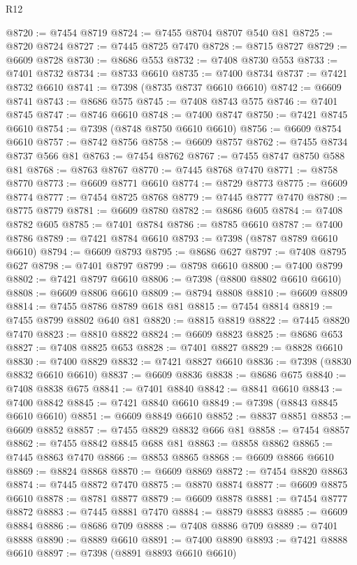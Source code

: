 \begin{lexlean}{R12}
\begin{coremodule}
{{{{{{{{{{{{{{{{{{{{{{{{{{{{{{{{{{{{{{{{{{{{{{{{{{{{{{{{{{{{{{{{{{{{{{{{{{{{{{{{{{@8720 := @7454 @8719
@8724 := @7455 @8704 @8707 @540 @81
@8725 := @8720 @8724
@8727 := @7445 @8725 @7470
@8728 := @8715 @8727
@8729 := @6609 @8728
@8730 := @8686 @553
@8732 := @7408 @8730 @553
@8733 := @7401 @8732
@8734 := @8733 @6610
@8735 := @7400 @8734
@8737 := @7421 @8732 @6610
@8741 := @7398 (@8735 @8737 @6610 @6610)
@8742 := @6609 @8741
@8743 := @8686 @575
@8745 := @7408 @8743 @575
@8746 := @7401 @8745
@8747 := @8746 @6610
@8748 := @7400 @8747
@8750 := @7421 @8745 @6610
@8754 := @7398 (@8748 @8750 @6610 @6610)
@8756 := @6609 @8754 @6610
@8757 := @8742 @8756
@8758 := @6609 @8757
@8762 := @7455 @8734 @8737 @566 @81
@8763 := @7454 @8762
@8767 := @7455 @8747 @8750 @588 @81
@8768 := @8763 @8767
@8770 := @7445 @8768 @7470
@8771 := @8758 @8770
@8773 := @6609 @8771 @6610
@8774 := @8729 @8773
@8775 := @6609 @8774
@8777 := @7454 @8725 @8768
@8779 := @7445 @8777 @7470
@8780 := @8775 @8779
@8781 := @6609 @8780
@8782 := @8686 @605
@8784 := @7408 @8782 @605
@8785 := @7401 @8784
@8786 := @8785 @6610
@8787 := @7400 @8786
@8789 := @7421 @8784 @6610
@8793 := @7398 (@8787 @8789 @6610 @6610)
@8794 := @6609 @8793
@8795 := @8686 @627
@8797 := @7408 @8795 @627
@8798 := @7401 @8797
@8799 := @8798 @6610
@8800 := @7400 @8799
@8802 := @7421 @8797 @6610
@8806 := @7398 (@8800 @8802 @6610 @6610)
@8808 := @6609 @8806 @6610
@8809 := @8794 @8808
@8810 := @6609 @8809
@8814 := @7455 @8786 @8789 @618 @81
@8815 := @7454 @8814
@8819 := @7455 @8799 @8802 @640 @81
@8820 := @8815 @8819
@8822 := @7445 @8820 @7470
@8823 := @8810 @8822
@8824 := @6609 @8823
@8825 := @8686 @653
@8827 := @7408 @8825 @653
@8828 := @7401 @8827
@8829 := @8828 @6610
@8830 := @7400 @8829
@8832 := @7421 @8827 @6610
@8836 := @7398 (@8830 @8832 @6610 @6610)
@8837 := @6609 @8836
@8838 := @8686 @675
@8840 := @7408 @8838 @675
@8841 := @7401 @8840
@8842 := @8841 @6610
@8843 := @7400 @8842
@8845 := @7421 @8840 @6610
@8849 := @7398 (@8843 @8845 @6610 @6610)
@8851 := @6609 @8849 @6610
@8852 := @8837 @8851
@8853 := @6609 @8852
@8857 := @7455 @8829 @8832 @666 @81
@8858 := @7454 @8857
@8862 := @7455 @8842 @8845 @688 @81
@8863 := @8858 @8862
@8865 := @7445 @8863 @7470
@8866 := @8853 @8865
@8868 := @6609 @8866 @6610
@8869 := @8824 @8868
@8870 := @6609 @8869
@8872 := @7454 @8820 @8863
@8874 := @7445 @8872 @7470
@8875 := @8870 @8874
@8877 := @6609 @8875 @6610
@8878 := @8781 @8877
@8879 := @6609 @8878
@8881 := @7454 @8777 @8872
@8883 := @7445 @8881 @7470
@8884 := @8879 @8883
@8885 := @6609 @8884
@8886 := @8686 @709
@8888 := @7408 @8886 @709
@8889 := @7401 @8888
@8890 := @8889 @6610
@8891 := @7400 @8890
@8893 := @7421 @8888 @6610
@8897 := @7398 (@8891 @8893 @6610 @6610)
}}}}}}}}}}}}}}}}}}}}}}}}}}}}}}}}}}}}}}}}}}}}}}}}}}}}}}}}}}}}}}}}}}}}}}}}}}}}}}}}}}
\end{coremodule}
\end{lexlean}
